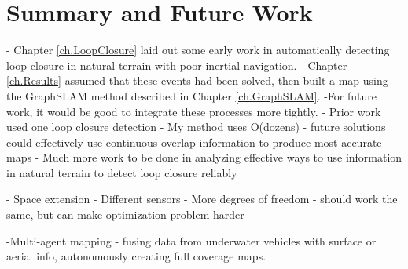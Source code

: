
\chapter{Summary and Future Work}
\label{ch.FutureWork}


- Chapter \ref{ch.LoopClosure} laid out some early work in automatically detecting loop closure in natural terrain with poor inertial navigation. 
- Chapter \ref{ch.Results} assumed that these events had been solved, then built a map using the GraphSLAM method described in Chapter \ref{ch.GraphSLAM}. 
-For future work, it would be good to integrate these processes more tightly.
	- Prior work used one loop closure detection
	- My method uses O(dozens)
	- future solutions could effectively use continuous overlap information to produce most accurate maps
- Much more work to be done in analyzing effective ways to use information in natural terrain to detect loop closure reliably

- Space extension 
	- Different sensors
	- More degrees of freedom - should work the same, but can make optimization problem harder
	
-Multi-agent mapping
	- fusing data from underwater vehicles with surface or aerial info, autonomously creating full coverage maps.